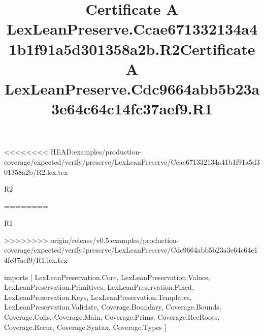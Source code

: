 <<<<<<<< HEAD:examples/production-coverage/expected/verify/preserve/LexLeanPreserve/Ccae671332134a41b1f91a5d301358a2b/R2.lex.tex
\begin{lexlean}{R2}
\title{Certificate A LexLeanPreserve.Ccae671332134a41b1f91a5d301358a2b.R2}
========
\begin{lexlean}{R1}
\title{Certificate A LexLeanPreserve.Cdc9664abb5b23a3e64c64c14fc37aef9.R1}
>>>>>>>> origin/release/v0.5:examples/production-coverage/expected/verify/preserve/LexLeanPreserve/Cdc9664abb5b23a3e64c64c14fc37aef9/R1.lex.tex
\begin{coremodule}
imports [
  LexLeanPreservation.Core,
  LexLeanPreservation.Values,
  LexLeanPreservation.Primitives,
  LexLeanPreservation.Fixed,
  LexLeanPreservation.Keys,
  LexLeanPreservation.Templates,
  LexLeanPreservation.Validate,
  Coverage.Boundary,
  Coverage.Bounds,
  Coverage.Colls,
  Coverage.Main,
  Coverage.Prims,
  Coverage.RecRoots,
  Coverage.Recur,
  Coverage.Syntax,
  Coverage.Types
]


\end{coremodule}
\end{lexlean}
\end{lexlean}
